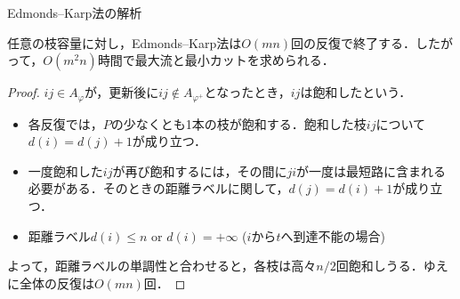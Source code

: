 \documentclass[14pt,aspectratio=169,xcolor=dvipsnames,table,onlytextwidth,dvipdfmx]{beamer}
\begin{document}
\begin{frame}{Edmonds--Karp法の解析}
    \small
    \begin{theorem}
        任意の枝容量に対し，Edmonds--Karp法は$O(mn)$回の反復で終了する．したがって，$O(m^2 n)$時間で最大流と最小カットを求められる．
    \end{theorem}
    \begin{proof}
    $ij \in A_\varphi$が，更新後に$ij \notin A_{\varphi^+}$となったとき，$ij$は\alert{飽和}したという．

    \begin{itemize}[<+->]
        \setlength\itemsep{0em}
        \item 各反復では，$P$の少なくとも1本の枝が飽和する．飽和した枝$ij$について$d(i) = d(j) + 1$が成り立つ．

        \item 一度飽和した$ij$が再び飽和するには，その間に$ji$が一度は最短路に含まれる必要がある．そのときの距離ラベルに関して，$d(j) = d(i) + 1$が成り立つ．
        
        \item 距離ラベル$d(i) \leq n$ or $d(i) = +\infty$ ($i$から$t$へ到達不能の場合) 
    \end{itemize}
    \bigskip
    \onslide<+->
    よって，距離ラベルの単調性と合わせると，各枝は高々$n/2$回飽和しうる．ゆえに全体の反復は$O(mn)$回． 
    \end{proof}
\end{frame}
\end{document}
